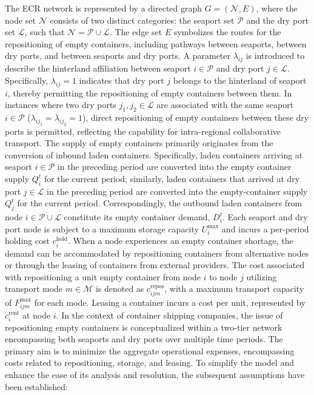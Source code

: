 \documentclass[preprint,12pt]{elsarticle}
\begin{document}
The ECR network is represented by a directed graph $G=\left(\mathcal{N},E\right)$, where the node set $\mathcal{N}$ consists of two distinct categories: the seaport set $\mathcal{P}$ and the dry port set $\mathcal{L}$, such that $\mathcal{N}=\mathcal{P}\cup\mathcal{L}$.  The edge set $E$ symbolizes the routes for the repositioning of empty containers, including pathways between seaports, between dry ports, and between seaports and dry ports. A parameter $\lambda_{ij}$ is introduced to describe the hinterland affiliation between seaport $i\in \mathcal{P}$ and dry port $j\in \mathcal{L}$. Specifically, $\lambda_{ij}=1$ indicates that dry port $j$ belongs to the hinterland of seaport $i$, thereby permitting the repositioning of empty containers between them. In instances where two dry ports $j_1,j_2\in \mathcal{L}$ are associated with the same seaport $i\in \mathcal{P}$ ($\lambda_{ij_1}=\lambda_{ij_2}=1$), direct repositioning of empty containers between these dry ports is permitted, reflecting the capability for intra-regional collaborative transport. The supply of empty containers primarily originates from the conversion of inbound laden containers. Specifically, laden containers arriving at seaport $i\in \mathcal{P}$ in the preceding period are converted into the empty container supply $Q_i^t$ for the current period; similarly, laden containers that arrived at dry port $j\in \mathcal{L}$ in the preceding period are converted into the empty-container supply $Q_j^t$ for the current period. Correspondingly, the outbound laden containers from node $i\in \mathcal{P}\cup\mathcal{L}$ constitute its empty container demand, $D_i^t$. Each seaport and dry port node is subject to a maximum storage capacity $U_i^{\max}$ and incurs a per-period holding cost $c_i^\text{hold}$. When a node experiences an empty container shortage, the demand can be accommodated by repositioning containers from alternative nodes or through the leasing of containers from external providers. The cost associated with repositioning a unit empty container from node $i$ to node $j$ utilizing transport mode $m\in \mathcal{M}$ is denoted as $c_{ijm}^\text{repos}$, with a maximum transport capacity of $F_{ijm}^{\max}$ for each mode. Leasing a container incurs a cost per unit, represented by $c_i^\text{rent}$ at node $i$.
In the context of container shipping companies, the issue of repositioning empty containers is conceptualized within a two-tier network encompassing both seaports and dry ports over multiple time periods. The primary aim is to minimize the aggregate operational expenses, encompassing costs related to repositioning, storage, and leasing. To simplify the model and enhance the ease of its analysis and resolution, the subsequent assumptions have been established:
\end{document}
